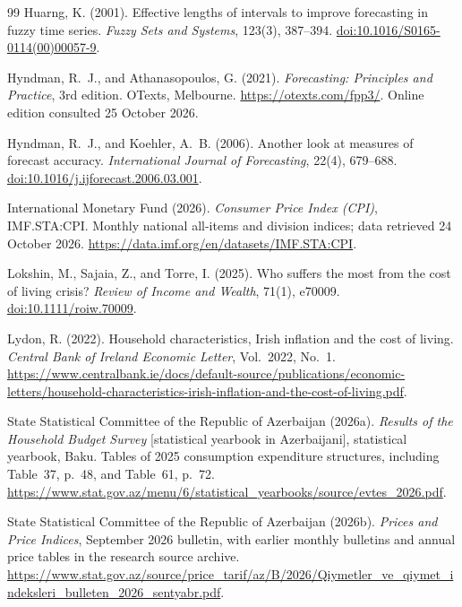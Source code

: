 \documentclass[11pt,a4paper]{article}
\begin{document}
\begin{thebibliography}{99}
Huarng, K. (2001). Effective lengths of intervals to improve forecasting in fuzzy time series.
\emph{Fuzzy Sets and Systems}, 123(3), 387--394.
\href{https://doi.org/10.1016/S0165-0114(00)00057-9}{doi:10.1016/S0165-0114(00)00057-9}.

Hyndman, R.~J., and Athanasopoulos, G. (2021).
\emph{Forecasting: Principles and Practice}, 3rd edition. OTexts, Melbourne.
\url{https://otexts.com/fpp3/}. Online edition consulted 25 October 2026.

Hyndman, R.~J., and Koehler, A.~B. (2006). Another look at measures of forecast accuracy.
\emph{International Journal of Forecasting}, 22(4), 679--688.
\href{https://doi.org/10.1016/j.ijforecast.2006.03.001}{doi:10.1016/j.ijforecast.2006.03.001}.

International Monetary Fund (2026). \emph{Consumer Price Index (CPI)}, IMF.STA:CPI.
Monthly national all-items and division indices; data retrieved 24 October 2026.
\url{https://data.imf.org/en/datasets/IMF.STA:CPI}.

Lokshin, M., Sajaia, Z., and Torre, I. (2025).
Who suffers the most from the cost of living crisis?
\emph{Review of Income and Wealth}, 71(1), e70009.
\href{https://doi.org/10.1111/roiw.70009}{doi:10.1111/roiw.70009}.

Lydon, R. (2022). Household characteristics, Irish inflation and the cost of living.
\emph{Central Bank of Ireland Economic Letter}, Vol.~2022, No.~1.
\url{https://www.centralbank.ie/docs/default-source/publications/economic-letters/household-characteristics-irish-inflation-and-the-cost-of-living.pdf}.

State Statistical Committee of the Republic of Azerbaijan (2026a).
\emph{Results of the Household Budget Survey} [statistical yearbook in Azerbaijani], statistical yearbook, Baku.
Tables of 2025 consumption expenditure structures, including Table~37, p.~48, and Table~61, p.~72.
\url{https://www.stat.gov.az/menu/6/statistical_yearbooks/source/evtes_2026.pdf}.

State Statistical Committee of the Republic of Azerbaijan (2026b).
\emph{Prices and Price Indices}, September 2026 bulletin, with earlier monthly bulletins and annual price tables in the research source archive.
\url{https://www.stat.gov.az/source/price_tarif/az/B/2026/Qiymetler_ve_qiymet_indeksleri_bulleten_2026_sentyabr.pdf}.


\end{thebibliography}
\end{document}
